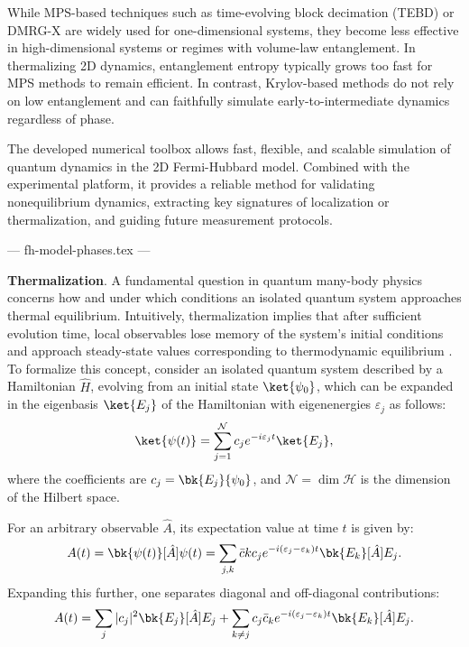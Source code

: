 While MPS-based techniques such as time-evolving block decimation (TEBD) or DMRG-X are widely used for one-dimensional systems, they become less effective in high-dimensional systems or regimes with volume-law entanglement. In thermalizing 2D dynamics, entanglement entropy typically grows too fast for MPS methods to remain efficient. In contrast, Krylov-based methods do not rely on low entanglement and can faithfully simulate early-to-intermediate dynamics regardless of phase.


The developed numerical toolbox allows fast, flexible, and scalable simulation of quantum dynamics in the 2D Fermi-Hubbard model. Combined with the experimental platform, it provides a reliable method for validating nonequilibrium dynamics, extracting key signatures of localization or thermalization, and guiding future measurement protocols.

--- fh-model-phases.tex ---




\textbf{Thermalization}.
A fundamental question in quantum many-body physics concerns how and under which conditions an isolated quantum system approaches thermal equilibrium. Intuitively, thermalization implies that after sufficient evolution time, local observables lose memory of the system's initial conditions and approach steady-state values corresponding to thermodynamic equilibrium \cite{khlebnikov_thermalization_2014}. To formalize this concept, consider an isolated quantum system described by a Hamiltonian $\hat{H}$, evolving from an initial state $\ket{\psi_0}$, which can be expanded in the eigenbasis ${\ket{E_j}}$ of the Hamiltonian with eigenenergies $\varepsilon_j$ as follows:
\begin{equation}
\ket{\psi(t)} = \sum_{j=1}^{\mathcal{N}} c_j e^{- i \varepsilon_j t} \ket{E_j},
\label{eq:evolution}
\end{equation}
where the coefficients are $c_j = \bk{E_j}{\psi_0}$, and $\mathcal{N} = \dim\mathcal{H}$ is the dimension of the Hilbert space.

For an arbitrary observable $\hat{A}$, its expectation value at time $t$ is given by:
\begin{equation}
A(t) = \bk{\psi(t)}[\hat{A}]{\psi(t)}
= \sum_{j,k} \bar{c}k c_j e^{-i (\varepsilon_j - \varepsilon_k) t} \bk{E_k}[\hat{A}]{E_j}.
\label{eq:observable_time}
\end{equation}
Expanding this further, one separates diagonal and off-diagonal contributions:
\begin{equation}
A(t) = \sum_j |c_j|^2 \bk{E_j}[\hat{A}]{E_j}
+ \sum_{k \neq j} c_j \bar{c}_k e^{-i (\varepsilon_j - \varepsilon_k) t} \bk{E_k}[\hat{A}]{E_j}.
\label{eq:At_expanded}
\end{equation}

